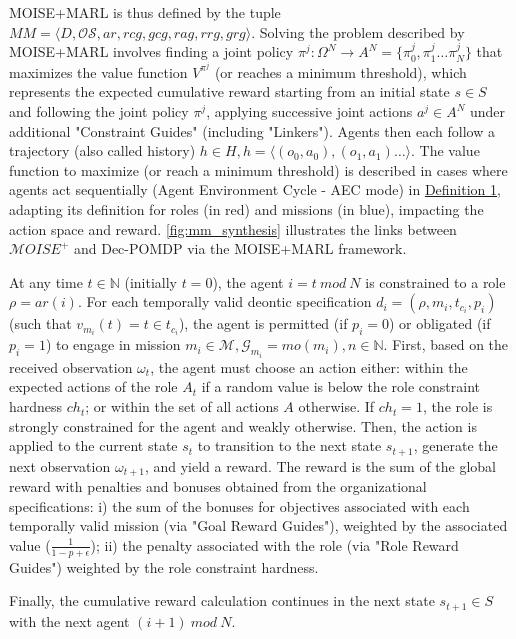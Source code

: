 \documentclass[sigconf,anonymous]{aamas}
\begin{document}
MOISE+MARL is thus defined by the tuple $MM = \langle D, \mathcal{OS}, ar, rcg, \allowbreak gcg, rag, rrg, grg\rangle$. Solving the problem described by MOISE+MARL involves finding a joint policy $\pi^{j}: \Omega^{N} \to A^{N} = \{\pi^j_0,\pi^j_1\dots\pi^j_N\}$ that maximizes the value function $V^{\pi^{j}}$ (or reaches a minimum threshold), which represents the expected cumulative reward starting from an initial state $s \in S$ and following the joint policy $\pi^{j}$, applying successive joint actions $a^{j} \in A^N$ under additional "Constraint Guides" (including "Linkers"). Agents then each follow a trajectory (also called history) $h \in H, h = \langle(o_0,a_0), (o_1,a_1)\dots\rangle$. The value function to maximize (or reach a minimum threshold) is described in cases where agents act sequentially (Agent Environment Cycle - AEC mode) in \hyperref[eq:single_value_function]{Definition 1}, adapting its definition for roles (in red) and missions (in blue), impacting the action space and reward. \autoref{fig:mm_synthesis} illustrates the links between $\mathcal{M}OISE^+$ and Dec-POMDP via the MOISE+MARL framework.

At any time $t \in \mathbb{N}$ (initially $t = 0$), the agent $i = t \ mod \ N$ is constrained to a role $\rho = ar(i)$. For each temporally valid deontic specification $d_i = (\rho,m_i,t_{c_i},p_i)$ (such that $v_{m_i}(t) = t \in t_{c_i}$), the agent is permitted (if $p_i = 0$) or obligated (if $p_i = 1$) to engage in mission $m_i \in \mathcal{M}, \mathcal{G}_{m_i} = mo(m_i), n \in \mathbb{N}$.
%
First, based on the received observation $\omega_t$, the agent must choose an action either: within the expected actions of the role $A_t$ if a random value is below the role constraint hardness $ch_t$; or within the set of all actions $A$ otherwise. If $ch_t = 1$, the role is strongly constrained for the agent and weakly otherwise.
%
Then, the action is applied to the current state $s_t$ to transition to the next state $s_{t+1}$, generate the next observation $\omega_{t+1}$, and yield a reward. The reward is the sum of the global reward with penalties and bonuses obtained from the organizational specifications: \quad i) the sum of the bonuses for objectives associated with each temporally valid mission (via "Goal Reward Guides"), weighted by the associated value ($\frac{1}{1-p+\epsilon}$); \quad ii) the penalty associated with the role (via "Role Reward Guides") weighted by the role constraint hardness.

Finally, the cumulative reward calculation continues in the next state $s_{t+1} \in S$ with the next agent $(i+1) \ mod \ N$.
\end{document}
